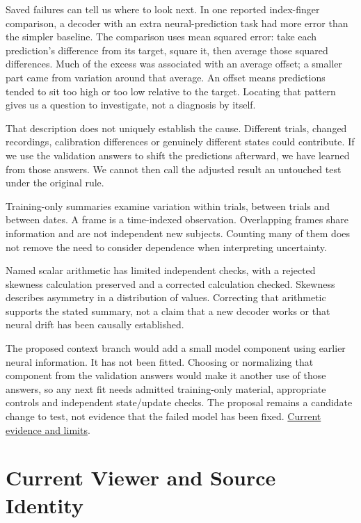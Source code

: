 Saved failures can tell us where to look next. In one reported index-finger comparison, a decoder with an extra neural-prediction task had more error than the simpler baseline. The comparison uses mean squared error: take each prediction's difference from its target, square it, then average those squared differences. Much of the excess was associated with an average offset; a smaller part came from variation around that average. An offset means predictions tended to sit too high or too low relative to the target. Locating that pattern gives us a question to investigate, not a diagnosis by itself.\par

That description does not uniquely establish the cause. Different trials, changed recordings, calibration differences or genuinely different states could contribute. If we use the validation answers to shift the predictions afterward, we have learned from those answers. We cannot then call the adjusted result an untouched test under the original rule.\par

Training-only summaries examine variation within trials, between trials and between dates. A frame is a time-indexed observation. Overlapping frames share information and are not independent new subjects. Counting many of them does not remove the need to consider dependence when interpreting uncertainty.\par

Named scalar arithmetic has limited independent checks, with a rejected skewness calculation preserved and a corrected calculation checked. Skewness describes asymmetry in a distribution of values. Correcting that arithmetic supports the stated summary, not a claim that a new decoder works or that neural drift has been causally established.\par

The proposed context branch would add a small model component using earlier neural information. It has not been fitted. Choosing or normalizing that component from the validation answers would make it another use of those answers, so any next fit needs admitted training-only material, appropriate controls and independent state/update checks. The proposal remains a candidate change to test, not evidence that the failed model has been fixed. \href{research-evidence.json}{Current evidence and limits}.\par

\section{Current Viewer and Source Identity}

